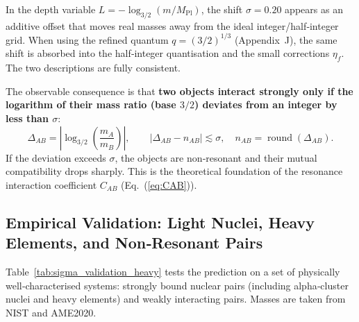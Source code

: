 \documentclass[12pt,a4paper]{article}
\begin{document}
In the depth variable $L = -\log_{3/2}(m/M_{\mathrm{Pl}})$, the shift $\sigma = 0.20$ appears as an additive offset that moves real masses away from the ideal integer/half‑integer grid. When using the refined quantum $q = (3/2)^{1/3}$ (Appendix~J), the same shift is absorbed into the half‑integer quantisation and the small corrections $\eta_f$. The two descriptions are fully consistent.

The observable consequence is that \textbf{two objects interact strongly only if the logarithm of their mass ratio (base $3/2$) deviates from an integer by less than $\sigma$}:
\begin{equation}
	\Delta_{AB} = \left| \log_{3/2}\!\left(\frac{m_A}{m_B}\right) \right|,\qquad |\Delta_{AB} - n_{AB}| \lesssim \sigma,\quad n_{AB} = \operatorname{round}(\Delta_{AB}).
\end{equation}
If the deviation exceeds $\sigma$, the objects are non‑resonant and their mutual compatibility drops sharply. This is the theoretical foundation of the resonance interaction coefficient $C_{AB}$ (Eq.~(\ref{eq:CAB})).

\subsection{Empirical Validation: Light Nuclei, Heavy Elements, and Non‑Resonant Pairs}

Table~\ref{tab:sigma_validation_heavy} tests the prediction on a set of physically well‑characterised systems: strongly bound nuclear pairs (including alpha‑cluster nuclei and heavy elements) and weakly interacting pairs. Masses are taken from NIST and AME2020.
\end{document}
